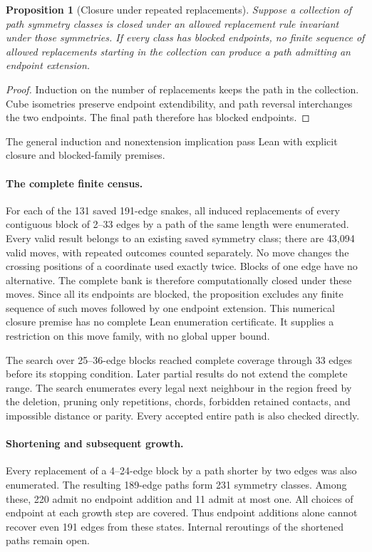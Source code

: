 \documentclass[11pt,a4paper]{article}
\newtheorem{proposition}[theorem]{Proposition}
\theoremstyle{definition}
\theoremstyle{remark}
\begin{document}
\begin{proposition}[Closure under repeated replacements]
Suppose a collection of path symmetry classes is closed under an allowed
replacement rule invariant under those symmetries. If every class has
blocked endpoints, no finite sequence of allowed replacements starting
in the collection can produce a path admitting an endpoint extension.
\end{proposition}
\begin{proof}
Induction on the number of replacements keeps the path in the collection.
Cube isometries preserve endpoint extendibility, and path reversal
interchanges the two endpoints. The final path therefore has blocked endpoints.
\end{proof}
The general induction and nonextension implication pass Lean with
explicit closure and blocked-family premises.

\paragraph{The complete finite census.}
For each of the 131 saved 191-edge snakes, all induced replacements
of every contiguous block of 2--33 edges by a path of the same length
were enumerated. Every valid result belongs to an existing saved
symmetry class; there are 43,094 valid moves, with repeated outcomes
counted separately. No move changes the crossing positions of a
coordinate used exactly twice. Blocks of one edge have no alternative.
The complete bank is therefore computationally closed under these moves.
Since all its endpoints are blocked, the proposition excludes any
finite sequence of such moves followed by one endpoint extension.
This numerical closure premise has no complete Lean enumeration certificate.
It supplies a restriction on this move family, with no global upper bound.

The search over 25--36-edge blocks reached complete coverage through
33 edges before its stopping condition. Later partial results do not
extend the complete range. The search enumerates every legal next
neighbour in the region freed by the deletion, pruning only repetitions,
chords, forbidden retained contacts, and impossible distance or parity.
Every accepted entire path is also checked directly.

\paragraph{Shortening and subsequent growth.}
Every replacement of a 4--24-edge block by a path shorter by two edges
was also enumerated. The resulting 189-edge paths form 231 symmetry
classes. Among these, 220 admit no endpoint addition and 11 admit at
most one. All choices of endpoint at each growth step are covered.
Thus endpoint additions alone cannot recover even 191 edges from
these states. Internal reroutings of the shortened paths remain open.
\end{document}
